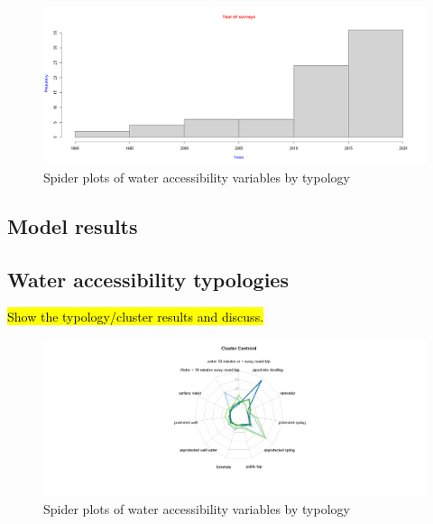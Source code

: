 \documentclass[10pt,twoside]{article}
\numberwithin{equation}{section}
\newcommand{\?}{\stackrel{?}{=}}
\begin{document}
\begin{figure}[h!]
  \centering
  \includegraphics[width=.7\textwidth]{year}
  \caption{Spider plots of water accessibility variables by typology}
  \label{fig:spider}
\end{figure}
\subsection*{Model results}

\subsection*{Water accessibility typologies}
\hl{Show the typology/cluster results and discuss.}

\begin{figure}[h!]
  \centering
  \includegraphics[width=.7\textwidth]{spider-plot}
  \caption{Spider plots of water accessibility variables by typology}
  \label{fig:spider}
\end{figure}
\end{document}

